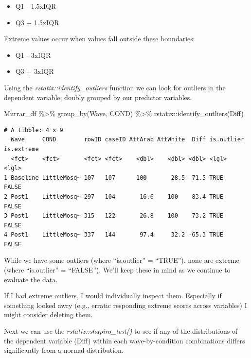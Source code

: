 \documentclass[
  11pt,
]{book}
\newenvironment{Shaded}{\begin{snugshade}}{\end{snugshade}}
\newcommand{\FunctionTok}[1]{\textcolor[rgb]{0.00,0.00,0.00}{#1}}
\newcommand{\NormalTok}[1]{#1}
\newcommand{\SpecialCharTok}[1]{\textcolor[rgb]{0.00,0.00,0.00}{#1}}
\providecommand{\tightlist}{%
  \setlength{\itemsep}{0pt}\setlength{\parskip}{0pt}}
\begin{document}
\begin{itemize}
\tightlist
\item
  Q1 - 1.5xIQR
\item
  Q3 + 1.5xIQR
\end{itemize}

Extreme values occur when values fall outside these boundaries:

\begin{itemize}
\tightlist
\item
  Q1 - 3xIQR
\item
  Q3 + 3xIQR
\end{itemize}

Using the \emph{rstatix::identify\_outliers} function we can look for outliers in the dependent variable, doubly grouped by our predictor variables.

\begin{Shaded}
\begin{Highlighting}[]
\NormalTok{Murrar\_df }\SpecialCharTok{\%\textgreater{}\%}
    \FunctionTok{group\_by}\NormalTok{(Wave, COND) }\SpecialCharTok{\%\textgreater{}\%}
\NormalTok{    rstatix}\SpecialCharTok{::}\FunctionTok{identify\_outliers}\NormalTok{(Diff)}
\end{Highlighting}
\end{Shaded}

\begin{verbatim}
# A tibble: 4 x 9
  Wave     COND        rowID caseID AttArab AttWhite  Diff is.outlier is.extreme
  <fct>    <fct>       <fct> <fct>    <dbl>    <dbl> <dbl> <lgl>      <lgl>     
1 Baseline LittleMosq~ 107   107      100       28.5 -71.5 TRUE       FALSE     
2 Post1    LittleMosq~ 297   104       16.6    100    83.4 TRUE       FALSE     
3 Post1    LittleMosq~ 315   122       26.8    100    73.2 TRUE       FALSE     
4 Post1    LittleMosq~ 337   144       97.4     32.2 -65.3 TRUE       FALSE     
\end{verbatim}

While we have some outliers (where ``is.outlier'' = ``TRUE''), none are extreme (where ``is.outlier'' = ``FALSE''). We'll keep these in mind as we continue to evaluate the data.

If I had extreme outliers, I would individually inspect them. Especially if something looked awry (e.g., erratic responding extreme scores across variables) I might consider deleting them.

Next we can use the \emph{rstatix::shapiro\_test()} to see if any of the distributions of the dependent variable (Diff) within each wave-by-condition combinations differs significantly from a normal distribution.
\end{document}
